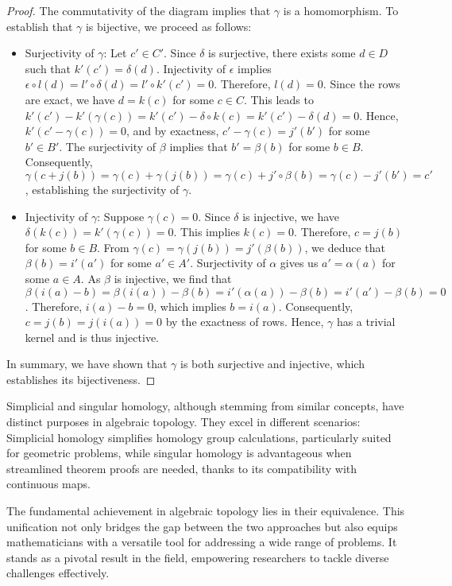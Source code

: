 \documentclass{amsart}
\begin{document}
\begin{proof}
The commutativity of the diagram implies that $\gamma$ is a homomorphism. To establish that $\gamma$ is bijective, we proceed as follows:
\begin{itemize}
    \item Surjectivity of $\gamma$: Let $c' \in C'$. Since $\delta$ is surjective, there exists some $d \in D$ such that $k'(c') = \delta(d)$. Injectivity of $\epsilon$ implies $\epsilon \circ l(d) = l' \circ \delta(d) = l' \circ k'(c') = 0$. Therefore, $l(d) = 0$. Since the rows are exact, we have $d = k(c)$ for some $c \in C$. This leads to $k'(c') - k'(\gamma(c)) = k'(c') - \delta \circ k(c) = k'(c') - \delta(d) = 0$. Hence, $k'(c' - \gamma(c)) = 0$, and by exactness, $c' - \gamma(c) = j'(b')$ for some $b' \in B'$. The surjectivity of $\beta$ implies that $b' = \beta(b)$ for some $b \in B$. Consequently, $\gamma(c + j(b)) = \gamma(c) + \gamma(j(b)) = \gamma(c) + j' \circ \beta(b) = \gamma(c) - j'(b') = c'$, establishing the surjectivity of $\gamma$.
    \item Injectivity of $\gamma$: Suppose $\gamma(c) = 0$. Since $\delta$ is injective, we have $\delta(k(c)) = k'(\gamma(c)) = 0$. This implies $k(c) = 0$. Therefore, $c = j(b)$ for some $b \in B$. From $\gamma(c) = \gamma(j(b)) = j'(\beta(b))$, we deduce that $\beta(b) = i'(a')$ for some $a' \in A'$. Surjectivity of $\alpha$ gives us $a' = \alpha(a)$ for some $a \in A$. As $\beta$ is injective, we find that $\beta(i(a) - b) = \beta(i(a)) - \beta(b) = i'(\alpha(a)) - \beta(b) = i'(a') - \beta(b) = 0$. Therefore, $i(a) - b = 0$, which implies $b = i(a)$. Consequently, $c = j(b) = j(i(a)) = 0$ by the exactness of rows. Hence, $\gamma$ has a trivial kernel and is thus injective.
\end{itemize}
In summary, we have shown that $\gamma$ is both surjective and injective, which establishes its bijectiveness.
\end{proof}

Simplicial and singular homology, although stemming from similar concepts, have distinct purposes in algebraic topology. They excel in different scenarios: Simplicial homology simplifies homology group calculations, particularly suited for geometric problems, while singular homology is advantageous when streamlined theorem proofs are needed, thanks to its compatibility with continuous maps.

The fundamental achievement in algebraic topology lies in their equivalence. This unification not only bridges the gap between the two approaches but also equips mathematicians with a versatile tool for addressing a wide range of problems. It stands as a pivotal result in the field, empowering researchers to tackle diverse challenges effectively.
\end{document}
